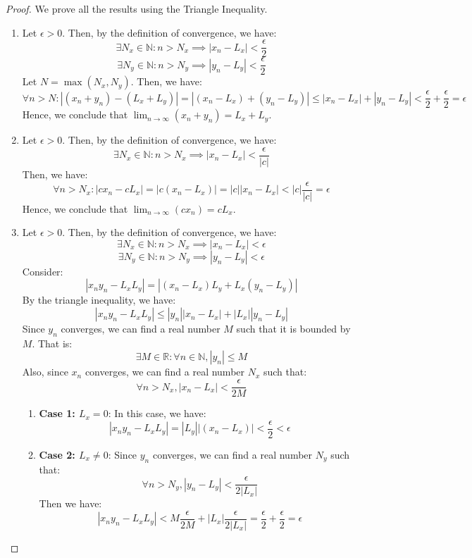 \documentclass[openany]{book}
\numberwithin{equation}{section}
\begin{document}
\begin{proof}
    We prove all the results using the Triangle Inequality. 
    \begin{enumerate}
    \item Let $\epsilon > 0$. Then, by the definition of convergence, we have:
    $$\exists N_x \in \mathbb{N}: n > N_x \implies |x_n - L_x| < \frac{\epsilon}{2}$$
    $$\exists N_y \in \mathbb{N}: n > N_y \implies |y_n - L_y| < \frac{\epsilon}{2}$$
    Let $N = \max(N_x, N_y)$. Then, we have:
    $$\forall n > N: |(x_n + y_n) - (L_x + L_y)| = |(x_n - L_x) + (y_n - L_y)| \leq |x_n - L_x| + |y_n - L_y| < \frac{\epsilon}{2} + \frac{\epsilon}{2} = \epsilon$$
    Hence, we conclude that $\lim_{n \to \infty} (x_n + y_n) = L_x + L_y$. \\
    \item Let $\epsilon > 0$. Then, by the definition of convergence, we have:
    $$\exists N_x \in \mathbb{N}: n > N_x \implies |x_n - L_x| < \frac{\epsilon}{|c|}$$
    Then, we have:  
    $$\forall n > N_x: |cx_n - cL_x| = |c(x_n - L_x)| = |c||x_n - L_x| < |c|\frac{\epsilon}{|c|} = \epsilon$$
    Hence, we conclude that $\lim_{n \to \infty} (cx_n) = c L_x$. \\
    \item Let $\epsilon > 0$. Then, by the definition of convergence, we have:
    $$\exists N_x \in \mathbb{N}: n > N_x \implies |x_n - L_x| < \epsilon$$
    $$\exists N_y \in \mathbb{N}: n > N_y \implies |y_n - L_y| < \epsilon$$
    Consider: 
    $$\left| x_n y_n - L_x L_y \right| = \left| (x_n - L_x)L_y + L_x(y_n - L_y) \right|$$
    By the triangle inequality, we have:
    $$\left| x_n y_n - L_x L_y \right| \leq |y_n||x_n - L_x| + |L_x||y_n - L_y|$$
    Since $y_n$ converges, we can find a real number $M$ such that it is bounded by $M$. That is: 
    $$\exists M \in \mathbb{R}: \forall n \in \mathbb{N}, |y_n| \leq M$$
    Also, since $x_n$ converges, we can find a real number $N_x$ such that:
    $$\forall n > N_x, |x_n - L_x| < \frac{\epsilon}{2M}$$
    \begin{enumerate}
        \item \textbf{Case 1: $L_x = 0$}: In this case, we have:
        $$\left| x_n y_n - L_x L_y \right| = \left| L_y \right|\left| (x_n - L_x) \right| < \frac{\epsilon}{2} < \epsilon$$
        \item \textbf{Case 2: $L_x \neq 0$}: Since $y_n$ converges, we can find a real number $N_y$ such that:
        $$\forall n > N_y, |y_n - L_y| < \frac{\epsilon}{2|L_x|}$$
        Then we have:
        $$\left| x_n y_n - L_x L_y \right| < M\frac{\epsilon}{2M} + |L_x|\frac{\epsilon}{2|L_x|} = \frac{\epsilon}{2} + \frac{\epsilon}{2} = \epsilon$$
    \end{enumerate}
    \end{enumerate}
\end{proof}
\end{document}

